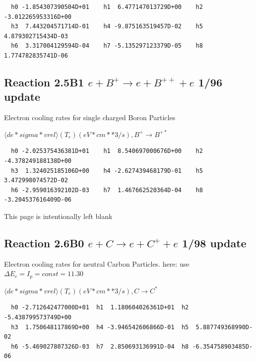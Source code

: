 \documentclass[12pt,dvips]{article}
\begin{document}
\begin{small}\begin{verbatim}
  h0 -1.854307390504D+01    h1  6.477147013729D+00    h2 -3.012265953316D+00
  h3  7.443204571714D-01    h4 -9.875163519457D-02    h5  4.879302715434D-03
  h6  3.317004129594D-04    h7 -5.135297123379D-05    h8  1.774782835741D-06
\end{verbatim}\end{small}

\subsection{
Reaction 2.5B1 $e + B^+ \rightarrow e + B^{++} + e $ 1/96 update
}

 Electron cooling rates for single
 charged Boron Particles

 $ \langle de*sigma*vrel \rangle(T_e)  (eV*cm**3/s), B^+ \rightarrow B^{+*} $


\begin{small}\begin{verbatim}
  h0 -2.025375436381D+01    h1  8.540697000676D+00    h2 -4.378249188138D+00
  h3  1.324025185106D+00    h4 -2.627439468179D-01    h5  3.472998074572D-02
  h6 -2.959016392102D-03    h7  1.467662520364D-04    h8 -3.204537616409D-06
\end{verbatim}\end{small}

\newpage
This page is intentionally left blank
\newpage

\subsection{
Reaction 2.6B0 $e + C \rightarrow e + C^+ + e  $ 1/98 update
}

 Electron cooling rates for neutral
 Carbon Particles. here: use $\Delta E_e = I_p = const = 11.30$

$  \langle de*sigma*vrel \rangle(T_e)  (eV*cm**3/s), C   \rightarrow C^* $


\begin{small}\begin{verbatim}
  h0 -2.712642477000D+01  h1  1.180604026361D+01  h2 -5.438799573749D+00
  h3  1.750648117869D+00  h4 -3.946542606866D-01  h5  5.887749368990D-02
  h6 -5.469027807326D-03  h7  2.850693136991D-04  h8 -6.354758903485D-06



\end{verbatim}\end{small}
\end{document}
